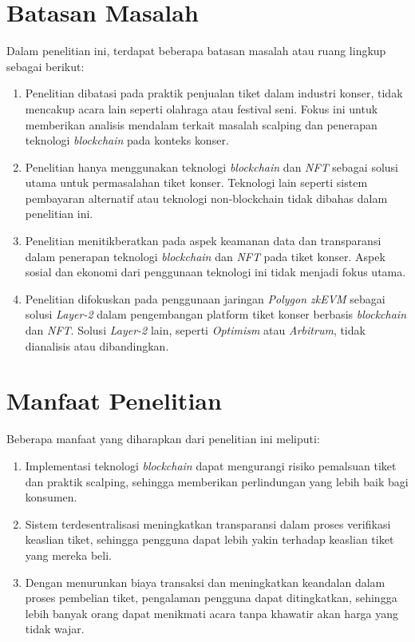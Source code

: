 \section{Batasan Masalah}
\label{sec:batasanmasalah}

Dalam penelitian ini, terdapat beberapa batasan masalah atau ruang lingkup
sebagai berikut:

\begin{enumerate}
      \item Penelitian dibatasi pada praktik penjualan tiket dalam industri konser, tidak
            mencakup acara lain seperti olahraga atau festival seni. Fokus ini untuk
            memberikan analisis mendalam terkait masalah scalping dan penerapan teknologi
            \textit{blockchain} pada konteks konser.

      \item Penelitian hanya menggunakan teknologi \textit{blockchain} dan \textit{NFT}
            sebagai solusi utama untuk permasalahan tiket konser. Teknologi lain seperti
            sistem pembayaran alternatif atau teknologi non-blockchain tidak dibahas dalam
            penelitian ini.

      \item Penelitian menitikberatkan pada aspek keamanan data dan transparansi dalam
            penerapan teknologi \textit{blockchain} dan \textit{NFT} pada tiket konser.
            Aspek sosial dan ekonomi dari penggunaan teknologi ini tidak menjadi fokus
            utama.

      \item Penelitian difokuskan pada penggunaan jaringan \textit{Polygon zkEVM} sebagai
            solusi \textit{Layer-2} dalam pengembangan platform tiket konser berbasis
            \textit{blockchain} dan \textit{NFT}. Solusi \textit{Layer-2} lain, seperti
            \textit{Optimism} atau \textit{Arbitrum}, tidak dianalisis atau dibandingkan.
\end{enumerate}
\section{Manfaat Penelitian}
\label{sec:manfaatpenelitian}

Beberapa manfaat yang diharapkan dari penelitian ini meliputi:

\begin{enumerate}
      \item Implementasi teknologi \textit{blockchain} dapat mengurangi risiko pemalsuan
            tiket dan praktik scalping, sehingga memberikan perlindungan yang lebih baik
            bagi konsumen.

      \item Sistem terdesentralisasi meningkatkan transparansi dalam proses verifikasi
            keaslian tiket, sehingga pengguna dapat lebih yakin terhadap keaslian tiket
            yang mereka beli.

      \item Dengan menurunkan biaya transaksi dan meningkatkan keandalan dalam proses
            pembelian tiket, pengalaman pengguna dapat ditingkatkan, sehingga lebih banyak
            orang dapat menikmati acara tanpa khawatir akan harga yang tidak wajar.
\end{enumerate}
